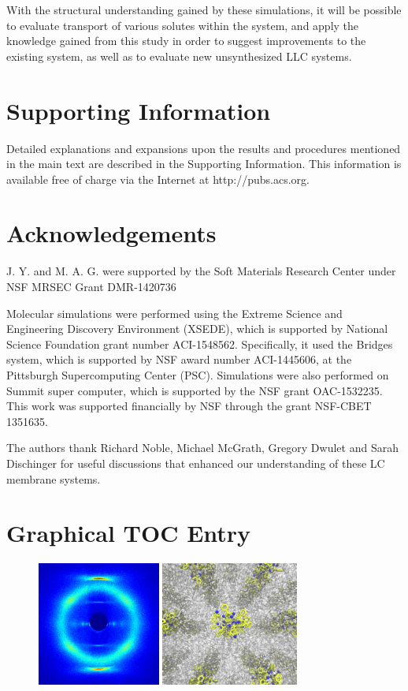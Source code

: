 \documentclass[journal=jpcbfk,manuscript=article]{achemso}
\begin{document}
  With the structural understanding gained by these simulations, it will be
  possible to evaluate transport of various solutes within the system, and apply the
  knowledge gained from this study in order to suggest improvements to the
  existing system, as well as to evaluate new unsynthesized LLC systems.

  \section*{Supporting Information}
  
  Detailed explanations and expansions upon the results and procedures mentioned in 
  the main text are described in the Supporting Information. This information is 
  available free of charge via the Internet at http://pubs.acs.org.

  \section*{Acknowledgements}

  J. Y. and M. A. G. were supported by the Soft Materials Research Center under NSF 
  MRSEC Grant DMR-1420736

  Molecular simulations were performed using the Extreme Science and Engineering Discovery
  Environment (XSEDE), which is supported by National Science Foundation grant number 
  ACI-1548562. Specifically, it used the Bridges system, which is supported by NSF award
  number ACI-1445606, at the Pittsburgh Supercomputing Center (PSC). Simulations were also
  performed on Summit super computer, which is supported by the NSF grant OAC-1532235. 
  This work was supported financially by NSF through the grant NSF-CBET 1351635.
  
  The authors thank Richard Noble, Michael McGrath, Gregory Dwulet and Sarah Dischinger
  for useful discussions that enhanced our understanding of these LC membrane systems. 

  \clearpage
  
  
  \newpage
  
  \section*{Graphical TOC Entry}
  \begin{figure}
  \includegraphics[width=4.07cm]{toc_waxs.pdf}
  \includegraphics[width=4.5cm]{toc_image_final.pdf}
  \end{figure}
\end{document}
